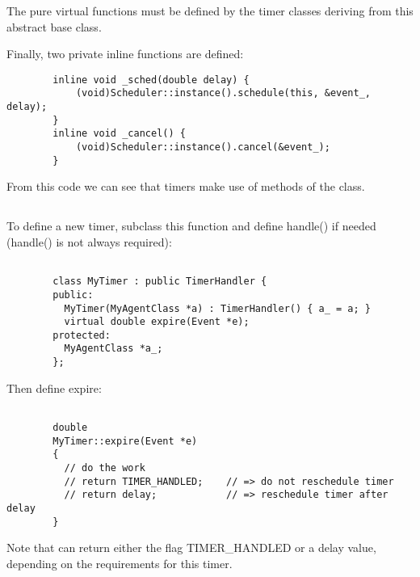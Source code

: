 The pure virtual functions must be defined by the timer classes deriving
from this abstract base class.

Finally, two private inline functions are defined:
\begin{small}
\begin{verbatim}
        inline void _sched(double delay) {
            (void)Scheduler::instance().schedule(this, &event_, delay);
        }
        inline void _cancel() {
            (void)Scheduler::instance().cancel(&event_);
        }
\end{verbatim}
\end{small}

From this code we can see that timers make use of methods of the 
 class.

\subsection{}

To define a new timer, subclass this function and define handle() if needed 
(handle() is not always required):

\begin{small}
\begin{verbatim}

        class MyTimer : public TimerHandler {
        public:
          MyTimer(MyAgentClass *a) : TimerHandler() { a_ = a; }
          virtual double expire(Event *e);
        protected:
          MyAgentClass *a_;
        };

\end{verbatim}
\end{small}

Then define expire:

\begin{small}
\begin{verbatim}

        double
        MyTimer::expire(Event *e)
        {
          // do the work
          // return TIMER_HANDLED;    // => do not reschedule timer
          // return delay;            // => reschedule timer after delay
        }

\end{verbatim}
\end{small}

Note that  can return either the flag TIMER\_HANDLED or a
delay value, depending on the requirements for this timer.

